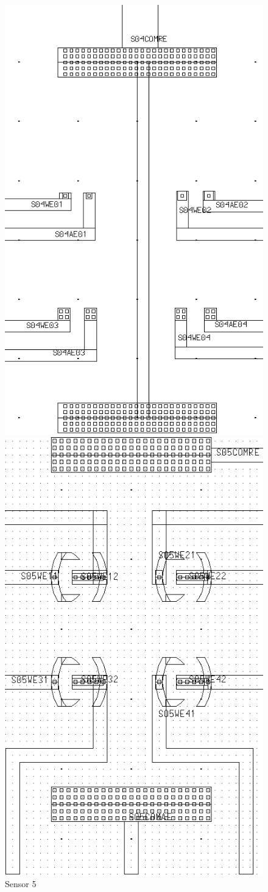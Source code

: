 \begin{description}
\begin{figure}
	\begin{minipage}{0.5\linewidth}
		\centering
		\includegraphics[width=0.6\linewidth]{figures/s04.png}
		\caption{Sensor 4}
		\label{s04}
	\end{minipage}
	\begin{minipage}{0.5\linewidth}
		\centering
		\includegraphics[width=0.6\linewidth]{figures/s05.png}
		\caption{Sensor 5}
		\label{s05}
	\end{minipage}
\end{figure}


\end{description}

